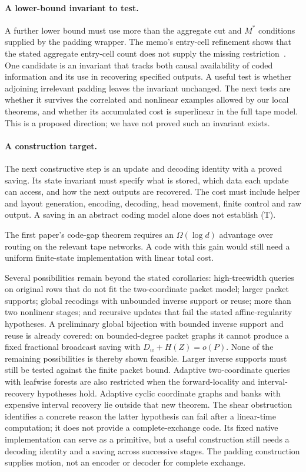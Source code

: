 \paragraph{A lower-bound invariant to test.}
A further lower bound must use more than the aggregate cut and $M^*$
conditions supplied by the padding wrapper. The memo's entry-cell refinement
shows that the stated aggregate entry-cell count does not supply the missing
restriction~\cite{PaddingMemo2026}. One candidate is an invariant
that tracks both causal availability of coded information and its use in
recovering specified outputs. A useful test is whether adjoining irrelevant
padding leaves the invariant unchanged. The next tests are whether it survives
the correlated and nonlinear examples allowed by our local theorems, and
whether its accumulated cost is superlinear in the full tape model.
This is a proposed direction; we have not proved such an invariant exists.

\paragraph{A construction target.}
The next constructive step is an update and decoding identity with a proved
saving. Its state invariant must specify what is stored, which data each
update can access, and how the next outputs are recovered. The cost must
include helper and layout generation, encoding, decoding, head movement,
finite control and raw output. A saving in an abstract coding model alone
does not establish \textup{(T)}.

The first paper's code-gap theorem requires an $\Omega(\log d)$ advantage over
routing on the relevant tape networks. A code with this gain would still need
a uniform finite-state implementation with linear total cost.

Several possibilities remain beyond the stated corollaries: high-treewidth queries
on original rows that do not fit the two-coordinate packet model; larger
packet supports; global recodings with unbounded inverse support or reuse;
more than two nonlinear stages; and recursive updates that fail the stated
affine-regularity hypotheses. A preliminary global bijection with bounded
inverse support and reuse is already covered: on bounded-degree packet
graphs it cannot produce a fixed fractional broadcast saving with
$D_w+H(Z)=o(P)$. None of the remaining possibilities is thereby shown feasible.
Larger inverse supports must still be tested against the finite packet bound.
Adaptive two-coordinate queries with leafwise forests are also restricted
when the forward-locality and interval-recovery hypotheses hold. Adaptive
cyclic coordinate graphs and banks with expensive interval recovery lie
outside that new theorem. The shear obstruction identifies a concrete reason
the latter hypothesis can fail after a linear-time computation; it does not
provide a complete-exchange code. Its fixed native implementation can serve
as a primitive, but a useful construction still needs a decoding identity
and a saving across successive stages.
The padding construction supplies motion, not an encoder or decoder for
complete exchange.

